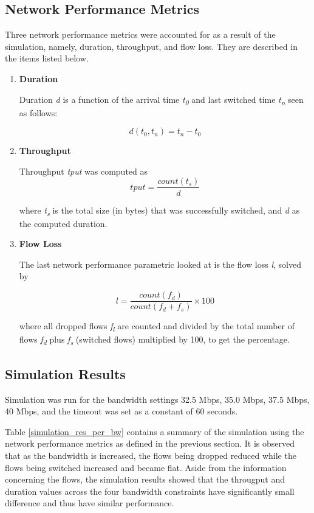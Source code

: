 \documentclass[journal]{IEEE/IEEEtran}
\begin{document}

\subsection{Network Performance Metrics}

Three network performance metrics were accounted for as a result of the simulation, namely, duration, throughput, and flow loss. They are described in the items listed below.

\begin{enumerate}
\item \textbf{Duration}


Duration \textit{d} is a function of the arrival time \textit{t\textsubscript{0}} and last switched time \textit{t\textsubscript{n}} seen as follows:

\[
	d(t_0, t_n) = t_n - t_0
\]

\item \textbf{Throughput}

Throughput \textit{tput} was computed as 
\[
	tput = \frac{count(t_s)}{d}
\]

where \textit{t\textsubscript{s}} is the total size (in bytes) that was successfully switched, and \textit{d} as the computed duration. 

\item \textbf{Flow Loss}

The last network performance parametric looked at is the flow loss \textit{l}, solved by

\[
	l = \frac{count(f_d)}{count(f_d + f_s)} \times 100
\]

where all dropped flows \textit{f\textsubscript{l}} are counted and divided by the total number of flows \textit{f\textsubscript{d}} plus \textit{f\textsubscript{s}} (switched flows) multiplied by 100, to get the percentage. 

\end{enumerate}

\subsection{Simulation Results}

Simulation was run for the bandwidth settings 32.5 Mbps, 35.0 Mbps, 37.5 Mbps, 40 Mbps, and the timeout was set as a constant of 60 seconds.

Table \ref{simulation_res_per_bw} contains a summary of the simulation using the network performance metrics as defined in the previous section. It is observed that as the bandwidth is increased, the flows being dropped reduced while the flows being switched increased and became flat. Aside from the information concerning the flows, the simulation results showed that the througput and duration values across the four bandwidth constraints have significantly small difference and thus have similar performance.
\end{document}
